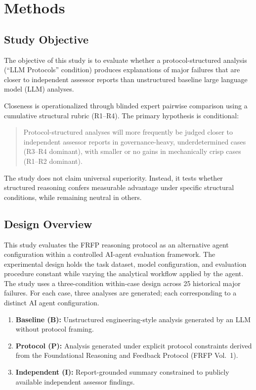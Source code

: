 \section{Methods}
\label{sec:methods}

\subsection{Study Objective}

The objective of this study is to evaluate whether a protocol-structured analysis (``LLM Protocols'' condition) produces explanations of major failures that are closer to independent assessor reports than unstructured baseline large language model (LLM) analyses. 

Closeness is operationalized through blinded expert pairwise comparison using a cumulative structural rubric (R1--R4). The primary hypothesis is conditional:

\begin{quote}
Protocol-structured analyses will more frequently be judged closer to independent assessor reports in governance-heavy, underdetermined cases (R3--R4 dominant), with smaller or no gains in mechanically crisp cases (R1--R2 dominant).
\end{quote}

The study does not claim universal superiority. Instead, it tests whether structured reasoning confers measurable advantage under specific structural conditions, while remaining neutral in others.

\subsection{Design Overview}
This study evaluates the FRFP reasoning protocol as an alternative
agent configuration within a controlled AI-agent evaluation framework.
The experimental design holds the task dataset, model configuration,
and evaluation procedure constant while varying the analytical workflow
applied by the agent.
The study uses a three-condition within-case design across 25 historical major failures.  For each case, three analyses are generated; each corresponding to a distinct AI agent configuration.
\begin{enumerate}
    \item \textbf{Baseline (B):} Unstructured engineering-style analysis generated by an LLM without protocol framing.
    \item \textbf{Protocol (P):} Analysis generated under explicit protocol constraints derived from the Foundational Reasoning and Feedback Protocol (FRFP Vol.~1).
    \item \textbf{Independent (I):} Report-grounded summary constrained to publicly available independent assessor findings.
\end{enumerate}

